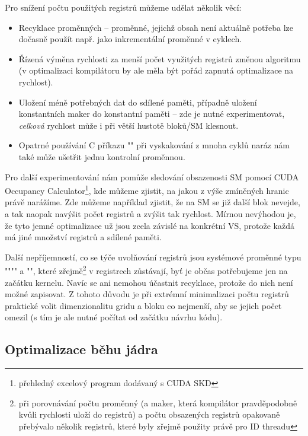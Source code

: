         Pro snížení počtu použitých registrů můžeme udělat několik věcí:
        \begin{itemize}
          \item Recyklace proměnných -- proměnné, jejichž obsah není aktuálně potřeba lze dočasně použít např. jako inkrementální proměnné v cyklech.
          \item Řízená výměna rychlosti za menší počet využitých registrů změnou algoritmu (v optimalizaci kompilátoru by ale měla být pořád zapnutá optimalizace na rychlost).
          \item Uložení méně potřebných dat do sdílené paměti, případně uložení konstantních maker do konstantní paměti -- zde je nutné experimentovat, \emph{celková} rychlost může i při větší hustotě bloků/SM klesnout.
          \item Opatrné používání C příkazu \Vr"" při vyskakování z mnoha cyklů naráz nám také může ušetřit jednu kontrolní proměnnou.
        \end{itemize}

        Pro další experimentování nám pomůže sledování obsazenosti SM pomocí CUDA Occupancy Calculator\footnote{přehledný excelový program dodávaný s CUDA SKD}, kde můžeme zjistit, na jakou z výše zmíněných hranic právě narážíme. Zde můžeme například zjistit, že na SM se již další blok nevejde, a tak naopak navýšit počet registrů a zvýšit tak rychlost. Mírnou nevýhodou je, že tyto jemné optimalizace už jsou zcela závislé na konkrétní VS, protože každá má jiné množství registrů a sdílené paměti.

        Další nepříjemností, co se týče uvolňování registrů jsou systémové proměnné typu \Vr""\linebreak\Vr"" a \Vr"", které zřejmě\footnote{při porovnávání počtu proměnný (a maker, která kompilátor pravděpodobně kvůli rychlosti uloží do registrů) a počtu obsazených registrů opakovaně přebývalo několik registrů, které byly zřejmě použity právě pro ID threadu} v registrech zůstávají, byť je občas potřebujeme jen na začátku kernelu. Navíc se ani nemohou účastnit recyklace, protože do nich není možné zapisovat. Z tohoto důvodu je při extrémní minimalizaci počtu registrů praktické volit dimenzionalitu gridu a bloku co nejmenší, aby se jejich počet omezil (s tím je ale nutné počítat od začátku návrhu kódu).

    \subsection{Optimalizace běhu jádra}

